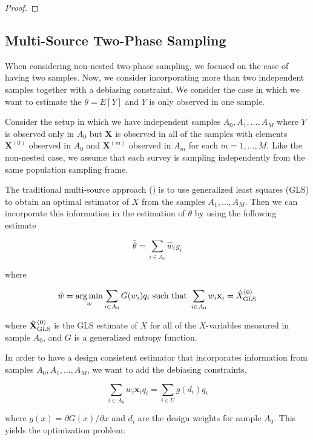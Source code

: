 \documentclass[12pt]{article}
\DeclareMathOperator*{\argmin}{arg\,min}
\renewcommand{\bf}[1]{\mathbf{#1}}
\begin{document}
\begin{proof}
\end{proof}

\subsection{Multi-Source Two-Phase Sampling}

When considering non-nested two-phase sampling, we focused on the case of having
two samples. Now, we consider incorporating more than two independent samples
together with a debiasing constraint. We consider the case in which we
want to estimate the $\theta = E[Y]$ and $Y$ is only observed in one sample.

Consider the setup in which we have independent samples $A_0, A_1, \dots, A_M$
where $Y$ is observed only in $A_0$ but $\bf X$ is observed in all of the
samples with elements $\bf X^{(0)}$ observed in $A_0$ and $\bf X^{(m)}$ observed
in $A_m$ for each $m = 1, \dots, M$. Like the non-nested case, we assume that
each survey is sampling independently from the same population sampling frame.

The traditional multi-source approach (\cite{kim2024statistics}) is to use
generalized least squares (GLS) to obtain an optimal estimator of $X$ from the
samples $A_1, \dots, A_M$. Then we can incorporate this information in the
estimation of $\theta$ by using the following estimate 

$$\hat \theta = \sum_{i \in A_0} \hat w_i y_i$$

where 

\begin{equation}\label{eq:mstps}
\hat w = \argmin_w \sum_{i \in A_0} G(w_i)q_i \text{ such that } 
\sum_{i \in A_0} w_i \bf x_i = \hat X_{\rm{GLS}}^{(0)}
\end{equation}

where $\hat{\bf X}_{\rm{GLS}}^{(0)}$ is the GLS estimate of $X$ for all of the
$X$-variables measured in sample $A_0$, and $G$ is a generalized entropy
function. 

In order to have a design consistent estimator that incorporates information from
samples $A_0, A_1, \dots, A_M$, we want to add the debiasing constraints, 

\begin{equation}\label{eq:msdebconstr}
\sum_{i \in A_0} w_{i} \bf x_i q_i = \sum_{i \in U} g(d_i) q_i
\end{equation}

where $g(x) = \partial G(x) / \partial x$ and $d_i$ are the design weights for
sample $A_0$. This yields the optimization problem:
\end{document}
